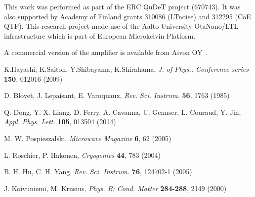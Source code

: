 \documentclass{twocol}
\begin{document}
This work was performed as part of the ERC QuDeT project (670743). It was
also supported by Academy of Finland grants 310086 (LTnoise) and 312295
(CoE QTF). This research project made use of the Aalto University
OtaNano/LTL infrastructure which is part of European Microkelvin
Platform.

A commercial version of the amplifier is available from Aivon OY~\cite{aivon}.

\begin{thebibliography}{}

K.Hayashi, K.Saiton, Y.Shibayama, K.Shirahama,
\textit{J. of Phys.: Conference series} {\bf 150}, 012016 (2009)

D. Bloyet, J. Lepaisant, E. Varoquaux,
\textit{Rev. Sci. Instrum.} {\bf 56}, 1763 (1985)


Q. Dong, Y. X. Liang, D. Ferry, A. Cavanna, U. Gennser, L. Couraud, Y. Jin,
\textit{Appl. Phys. Lett.} {\bf 105}, 013504 (2014)


M. W. Pospieszalski,
\textit{Microwave Magazine} {\bf 6}, 62 (2005)

L. Roschier, P. Hakonen,
\textit{Cryogenics} {\bf 44}, 783 (2004)

B. H. Hu, C. H. Yang,
\textit{Rev. Sci. Instrum.} {\bf 76}, 124702-1 (2005)


J. Koivuniemi, M. Krusius,
\textit{Phys. B: Cond. Matter} {\bf 284-288}, 2149 (2000)



\end{thebibliography}
\end{document}
